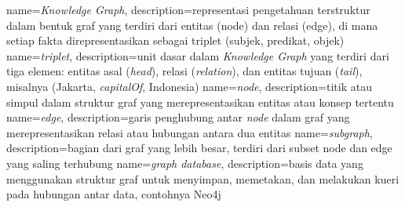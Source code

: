 {
	name={\textit{Knowledge Graph}},
	description={representasi pengetahuan terstruktur dalam bentuk graf yang terdiri dari entitas (node) dan relasi (edge), di mana setiap fakta direpresentasikan sebagai triplet (subjek, predikat, objek)}
}
{
	name={\textit{triplet}},
	description={unit dasar dalam \textit{Knowledge Graph} yang terdiri dari tiga elemen: entitas asal (\textit{head}), relasi (\textit{relation}), dan entitas tujuan (\textit{tail}), misalnya (Jakarta, \textit{capitalOf}, Indonesia)}
}
{
	name={\textit{node}},
	description={titik atau simpul dalam struktur graf yang merepresentasikan entitas atau konsep tertentu}
}
{
	name={\textit{edge}},
	description={garis penghubung antar \textit{node} dalam graf yang merepresentasikan relasi atau hubungan antara dua entitas}
}
{
	name={\textit{subgraph}},
	description={bagian dari graf yang lebih besar, terdiri dari subset node dan edge yang saling terhubung}
}
{
	name={\textit{graph database}},
	description={basis data yang menggunakan struktur graf untuk menyimpan, memetakan, dan melakukan kueri pada hubungan antar data, contohnya Neo4j}
}

